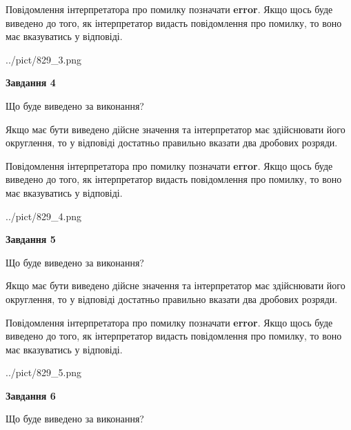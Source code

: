 \documentclass[12pt, ukrainian]{article}
\begin{document}
{\begin {Large}
Повідомлення інтерпретатора про помилку позначати \textbf{error}.
Якщо щось буде виведено до того, як інтерпретатор видасть повідомлення про помилку, 
то воно має вказуватись у відповіді. \par

\begin{center}
	{../pict/829_3.png}
\end{center}
\newpage

{\begin {center}\textbf{Завдання 4}\end {center}}\par
Що буде виведено за виконання? \par

Якщо має бути виведено дійсне значення та інтерпретатор має здійснювати його округлення, 
то у відповіді достатньо правильно вказати два дробових розряди.

Повідомлення інтерпретатора про помилку позначати \textbf{error}.
Якщо щось буде виведено до того, як інтерпретатор видасть повідомлення про помилку, 
то воно має вказуватись у відповіді. \par

\begin{center}
	{../pict/829_4.png}
\end{center}
\newpage

{\begin {center}\textbf{Завдання 5}\end {center}}\par
Що буде виведено за виконання? \par

Якщо має бути виведено дійсне значення та інтерпретатор має здійснювати його округлення, 
то у відповіді достатньо правильно вказати два дробових розряди.

Повідомлення інтерпретатора про помилку позначати \textbf{error}.
Якщо щось буде виведено до того, як інтерпретатор видасть повідомлення про помилку, 
то воно має вказуватись у відповіді. \par

\begin{center}
	{../pict/829_5.png}
\end{center}
\newpage

{\begin {center}\textbf{Завдання 6}\end {center}}\par
Що буде виведено за виконання? \par


\end{Large}}
\end{document}
